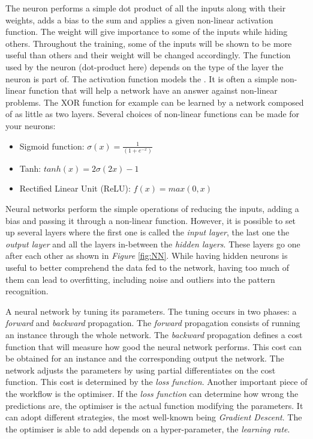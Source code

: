 The neuron performs a simple dot product of all the inputs along with their weights, adds a bias to the sum and applies a given non-linear activation function. The weight will give importance to some of the inputs while hiding others. Throughout the training, some of the inputs will be shown to be more useful than others and their weight will be changed accordingly. The function used by the neuron (dot-product here) depends on the type of the layer the neuron is part of. The activation function models the . It is often a simple non-linear function that will help a network have an answer against non-linear problems. The XOR function for example can be learned by a network composed of as little as two layers. Several choices of non-linear functions can be made for your neurons:
\begin{itemize}
  \item Sigmoid function: $\sigma(x) = \frac{1}{(1+e^{-x})}$
  \item Tanh: $tanh(x) = 2\sigma(2x) - 1$
  \item Rectified Linear Unit (ReLU): $ f(x) = max(0,x) $
\end{itemize}

Neural networks perform the simple operations of reducing the inputs, adding a bias and passing it through a non-linear function. However, it is possible to set up several layers where the first one is called the \emph{input layer}, the last one the \emph{output layer} and all the layers in-between the \emph{hidden layers}. These layers go one after each other as shown in \emph{Figure} \ref{fig:NN}. While having hidden neurons is useful to better comprehend the data fed to the network, having too much of them can lead to overfitting, including noise and outliers into the pattern recognition.


A neural network  by tuning its parameters. The tuning occurs in two phases: a \emph{forward} and \emph{backward} propagation. The \emph{forward} propagation consists of running an instance through the whole network. The \emph{backward} propagation defines a cost function that will measure how good the neural network performs. This cost can be obtained for an instance and the corresponding output the network. The network adjusts the parameters by using partial differentiates on the cost function. This cost is determined by the \emph{loss function}. Another important piece of the workflow is the optimiser. If the \emph{loss function} can determine how wrong the predictions are, the optimiser is the actual function modifying the parameters. It can adopt different strategies, the most well-known being \emph{Gradient Descent}. The  the optimiser is able to add depends on a hyper-parameter, the \emph{learning rate}.

